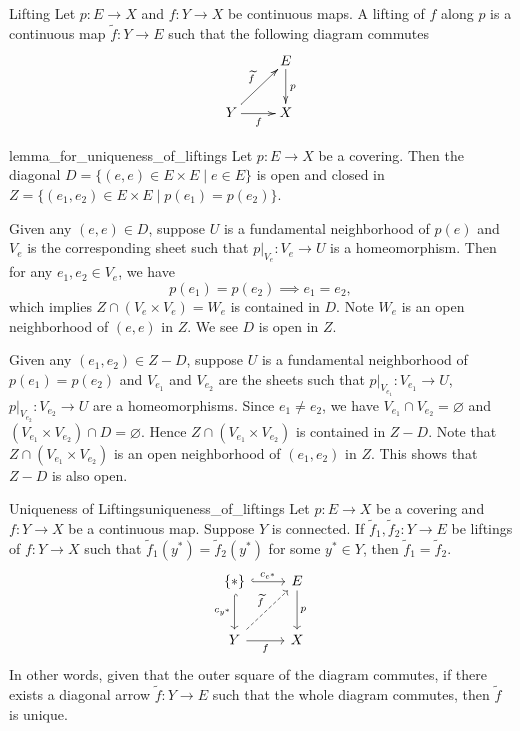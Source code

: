 \documentclass{report}
\begin{document}
\begin{definition}{Lifting}{}
	Let $p:E\to X$ and $f:Y\to X$ be continuous maps. A lifting of $f$ along $p$ is a continuous map $\widetilde{f}:Y\to E$ such that the following diagram commutes
	\[\xymatrix{
		& E\ar[d]^{p}\\
		Y\ar[ur]^{\widetilde{f}}\ar[r]_{f} &X
		}\]
\end{definition}




\begin{lemma}{}{lemma_for_uniqueness_of_liftings}
	Let $p: E \rightarrow X$ be a covering. Then the diagonal $D=\{(e, e) \in E \times E \mid e\in E\}$ is open and closed in $Z=\{(e_1, e_2) \in E \times E \mid p(e_1)=p(e_2)\}$.
\end{lemma}

\begin{prf}
	Given any $(e,e)\in D$, suppose $U$ is a fundamental neighborhood of $p(e)$ and $V_e$ is the corresponding sheet such that $\left.p\right|_{V_e}:V_e\to U$ is a homeomorphism. Then for any $e_1,e_2\in V_e$, we have
	\[
		p(e_1)=p(e_2)\implies e_1=e_2,
	\]
	which implies $Z \cap\left(V_e \times V_e\right)=W_e$ is contained in $D$. Note $W_e$ is an open neighborhood of $(e, e)$ in $Z$. We see $D$ is open in $Z$.

	Given any $(e_1,e_2)\in Z-D$, suppose $U$ is a fundamental neighborhood of $p(e_1)=p(e_2)$ and $V_{e_1}$ and $V_{e_2}$ are the sheets such that $\left.p\right|_{V_{e_1}}:V_{e_1}\to U$, $\left.p\right|_{V_{e_2}}:V_{e_2}\to U$ are a homeomorphisms. Since $e_1 \ne e_2$, we have $V_{e_1} \cap V_{e_2}=\varnothing$ and $\left(V_{e_1}\times V_{e_2}\right)\cap D=\varnothing$. Hence $Z \cap\left(V_{e_1} \times V_{e_2} \right)$  is contained in $Z-D$. Note that $Z \cap\left(V_{e_1} \times V_{e_2} \right)$ is an open neighborhood of $(e_1,e_2)$ in $Z$. This shows that $Z- D$ is also open.
\end{prf}


\begin{proposition}{Uniqueness of Liftings}{uniqueness_of_liftings}
	Let $p: E \rightarrow X$ be a covering and $f: Y \rightarrow X$ be a continuous map. Suppose $Y$ is connected. If $\widetilde{f}_1, \widetilde{f}_2: Y \rightarrow E$ be liftings of $f: Y \rightarrow X$ such that $\widetilde{f}_1(y^*)=\widetilde{f}_2(y^*)$ for some $y^*\in Y$, then $\widetilde{f}_1=\widetilde{f}_2$.
	\[
		\begin{tikzcd}[ampersand replacement=\&]
			\{*\} \arrow[r, "c_{e^*}", hook] \arrow[d, "c_{y^*}"', hook]                      \& E \arrow[d, "p"] \\ [+8pt]
			Y \arrow[r, "f"'] \arrow[ru, "\widetilde{f}", dashed] \& X
		\end{tikzcd}
	\]
	In other words, given that the outer square of the diagram commutes, if there exists a diagonal arrow $\widetilde{f}:Y\to E$ such that the whole diagram commutes, then $\widetilde{f}$ is unique.
\end{proposition}
\end{document}
